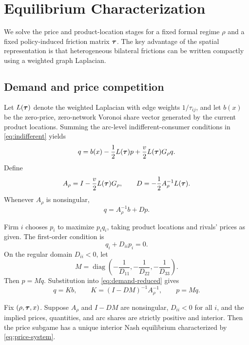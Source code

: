 \section{Equilibrium Characterization}\label{sec:equilibrium}

We solve the price and product-location stages for a fixed formal regime $\rho$ and a fixed policy-induced friction matrix $\boldsymbol{\tau}$. The key advantage of the spatial representation is that heterogeneous bilateral frictions can be written compactly using a weighted graph Laplacian.

\subsection{Demand and price competition}

Let $L(\boldsymbol{\tau})$ denote the weighted Laplacian with edge weights $1/\tau_{ij}$, and let $b(x)$ be the zero-price, zero-network Voronoi share vector generated by the current product locations. Summing the arc-level indifferent-consumer conditions in \eqref{eq:indifferent} yields
\begin{equation}\label{eq:affine-demand}
q=b(x)-\frac12L(\boldsymbol{\tau})p+\frac v2L(\boldsymbol{\tau})G_\rho q.
\end{equation}
Define
\[
A_\rho=I-\frac v2L(\boldsymbol{\tau})G_\rho,
\qquad
D=-\frac12A_\rho^{-1}L(\boldsymbol{\tau}).
\]
Whenever $A_\rho$ is nonsingular,
\begin{equation}\label{eq:demand-reduced}
q=A_\rho^{-1}b+Dp.
\end{equation}

Firm $i$ chooses $p_i$ to maximize $p_iq_i$, taking product locations and rivals' prices as given. The first-order condition is
\begin{equation}\label{eq:price-foc}
q_i+D_{ii}p_i=0.
\end{equation}
On the regular domain $D_{ii}<0$, let
\[
M=\operatorname{diag}\left(-\frac1{D_{11}},-\frac1{D_{22}},-\frac1{D_{33}}\right).
\]
Then $p=Mq$. Substitution into \eqref{eq:demand-reduced} gives
\begin{equation}\label{eq:price-system}
q=Kb,
\qquad
K=(I-DM)^{-1}A_\rho^{-1},
\qquad
p=Mq.
\end{equation}

\begin{proposition}\label{prop:price}
Fix $(\rho,\boldsymbol{\tau},x)$. Suppose $A_\rho$ and $I-DM$ are nonsingular, $D_{ii}<0$ for all $i$, and the implied prices, quantities, and arc shares are strictly positive and interior. Then the price subgame has a unique interior Nash equilibrium characterized by \eqref{eq:price-system}.
\end{proposition}

